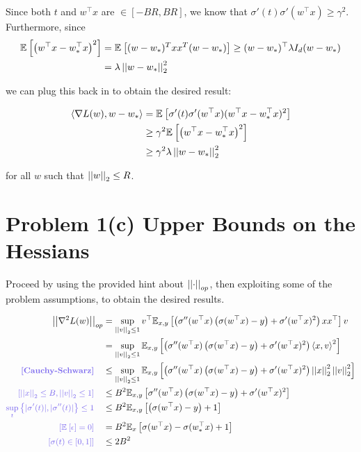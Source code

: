 \documentclass[11pt]{article}
\newcommand{\1}{\mathbb{I}} %
\begin{document}
Since both $t$ and $w^\top x$ are $\in [-BR, BR]$, we know that $\sigma'(t) \sigma'(w^\top x) \geq \gamma^2$. Furthermore, since 
\begin{align}
	\E{ \lr{w^\top x - w^\top_* x}^2 }
		&= \E{ (w - w_*)^T x x^T (w - w_*)  } 
		\geq (w - w_*)^\top \lambda I_d (w - w_*) \\
		&= \lambda \norm{w - w_*}^2
\end{align}

we can plug this back in to obtain the desired result:

\begin{align}
\innerprod{\nabla L(w)}{w - w_*}
	&= \E{ \sigma'(t)  \sigma'(w^\top x) (w^\top x - w^\top_* x)^2  } \\
	&\geq \gamma^2 \E{ \lr{w^\top x - w^\top_* x}^2 } \\
	&\geq \gamma^2  \lambda \norm{w - w_*}^2
\end{align}

for all $w$ such that $\norm{w} \leq R$. 




\clearpage 
\section*{Problem 1(c) Upper Bounds on the Hessians}


Proceed by using the provided hint about $\norm[op]{\cdot}$, then exploiting some of the problem assumptions, to obtain the desired results. 

\begin{align}
	\norm[op]{\nabla^2 L(w)}
		&= \sup_{\norm{v} \leq 1} v^\top \E[x,y]{\lr{\sigma''(w^\top x) \lr{\sigma(w^\top x) - y}  + \sigma'(w^\top x)^2} x x^\top} v \\
		&= \sup_{\norm{v} \leq 1} \E[x,y]{\lr{\sigma''(w^\top x) \lr{\sigma(w^\top x) - y}  + \sigma'(w^\top x)^2} \innerprod{x}{v}^2} \\
		\mtblue{[Cauchy-Schwarz]} \quad
			&\leq \sup_{\norm{v} \leq 1} \E[x,y]{\lr{\sigma''(w^\top x) \lr{\sigma(w^\top x) - y}  + \sigma'(w^\top x)^2} \norm{x}^2 \norm{v}^2} \\
		\mblue{[\norm{x} \leq B, \norm{v} \leq 1]} \quad
			&\leq  B^2 \E[x,y]{\sigma''(w^\top x) \lr{\sigma(w^\top x) - y}  + \sigma'(w^\top x)^2 } \\
		\mblue{\sup_t \left\{ |\sigma'(t)|, |\sigma''(t) |\right\} \leq 1 }\quad
			&\leq  B^2 \E[x,y]{ \lr{\sigma(w^\top x) - y}  + 1 } \\
		\mblue{[\E{\epsilon} = 0]} \quad
			&= B^2 \E[x]{ \sigma(w^\top x) - \sigma(w_*^\top x)  + 1 }  \label{eq:1c-1} \\
		\mblue{[\sigma(t) \in [0, 1]]} \quad
			&\leq 2 B^2
\end{align}
\end{document}
